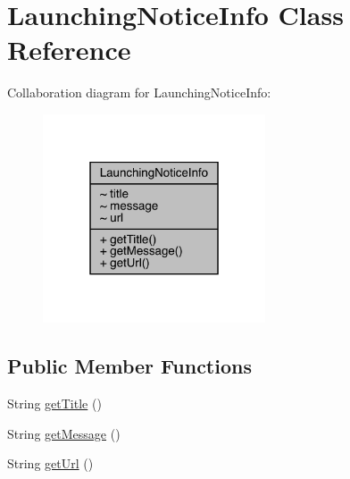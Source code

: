 \hypertarget{classcom_1_1toast_1_1android_1_1gamebase_1_1launching_1_1data_1_1_launching_notice_info}{}\section{Launching\+Notice\+Info Class Reference}
\label{classcom_1_1toast_1_1android_1_1gamebase_1_1launching_1_1data_1_1_launching_notice_info}


Collaboration diagram for Launching\+Notice\+Info\+:
\nopagebreak
\begin{figure}[H]
\begin{center}
\leavevmode
\includegraphics[width=187pt]{classcom_1_1toast_1_1android_1_1gamebase_1_1launching_1_1data_1_1_launching_notice_info__coll__graph}
\end{center}
\end{figure}
\subsection*{Public Member Functions}
\begin{DoxyCompactItemize}
\item 
String \hyperlink{classcom_1_1toast_1_1android_1_1gamebase_1_1launching_1_1data_1_1_launching_notice_info_a888f94790c968e3f0b5de17e509098aa}{get\+Title} ()
\item 
String \hyperlink{classcom_1_1toast_1_1android_1_1gamebase_1_1launching_1_1data_1_1_launching_notice_info_afafd068b736520af1e24269a284980a9}{get\+Message} ()
\item 
String \hyperlink{classcom_1_1toast_1_1android_1_1gamebase_1_1launching_1_1data_1_1_launching_notice_info_ad2ea28664c7db5089385e62816477d28}{get\+Url} ()
\end{DoxyCompactItemize}


